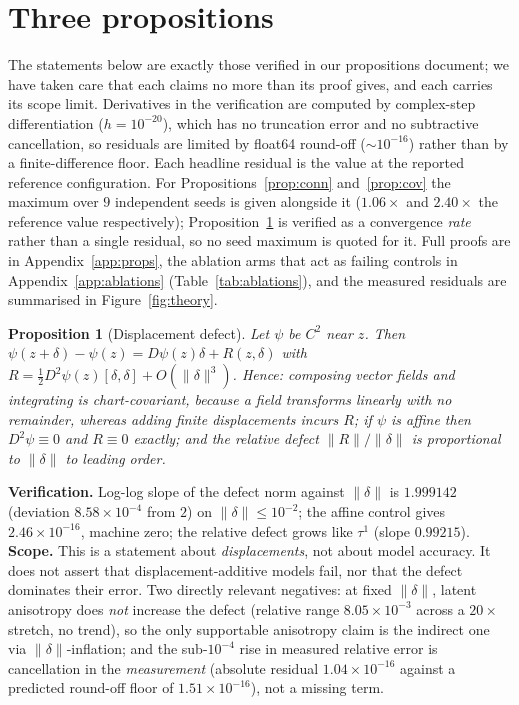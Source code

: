 \documentclass{article}
\newtheorem{proposition}{Proposition}
\begin{document}
\section{Three propositions}
\label{sec:props}

The statements below are exactly those verified in our propositions document; we have taken
care that each claims no more than its proof gives, and each carries its scope limit.
Derivatives in the verification are computed by complex-step differentiation
($h = 10^{-20}$), which has no truncation error and no subtractive cancellation, so residuals
are limited by float64 round-off ($\sim\!10^{-16}$) rather than by a finite-difference floor.
Each headline residual is the value at the reported reference configuration. For
Propositions~\ref{prop:conn} and~\ref{prop:cov} the maximum over $9$ independent seeds is
given alongside it ($1.06\times$ and $2.40\times$ the reference value respectively);
Proposition~\ref{prop:defect} is verified as a convergence \emph{rate} rather than a single
residual, so no seed maximum is quoted for it. Full proofs are in
Appendix~\ref{app:props}, the ablation arms that act as failing controls in
Appendix~\ref{app:ablations} (Table~\ref{tab:ablations}), and the measured residuals are
summarised in Figure~\ref{fig:theory}.

\begin{proposition}[Displacement defect]
\label{prop:defect}
Let $\psi$ be $C^{2}$ near $z$. Then
$\psi(z+\delta) - \psi(z) = D\psi(z)\delta + R(z,\delta)$ with
$R = \tfrac12 D^{2}\psi(z)[\delta,\delta] + O(\|\delta\|^{3})$. Hence: composing vector
\emph{fields} and integrating is chart-covariant, because a field transforms linearly with no
remainder, whereas adding finite \emph{displacements} incurs $R$; if $\psi$ is affine then
$D^{2}\psi \equiv 0$ and $R \equiv 0$ \emph{exactly}; and the relative defect
$\|R\|/\|\delta\|$ is proportional to $\|\delta\|$ to leading order.
\end{proposition}

\noindent\textbf{Verification.} Log-log slope of the defect norm against $\|\delta\|$ is
$1.999142$ (deviation $8.58\times10^{-4}$ from $2$) on $\|\delta\| \le 10^{-2}$; the affine
control gives $2.46\times10^{-16}$, machine zero; the relative defect grows like $\tau^{1}$
(slope $0.99215$).
\textbf{Scope.} This is a statement about \emph{displacements}, not about model accuracy. It
does not assert that displacement-additive models fail, nor that the defect dominates their
error. Two directly relevant negatives: at fixed $\|\delta\|$, latent anisotropy does
\emph{not} increase the defect (relative range $8.05\times10^{-3}$ across a $20\times$
stretch, no trend), so the only supportable anisotropy claim is the indirect one via
$\|\delta\|$-inflation; and the sub-$10^{-4}$ rise in measured relative error is
cancellation in the \emph{measurement} (absolute residual $1.04\times10^{-16}$ against a
predicted round-off floor of $1.51\times10^{-16}$), not a missing term.
\end{document}
